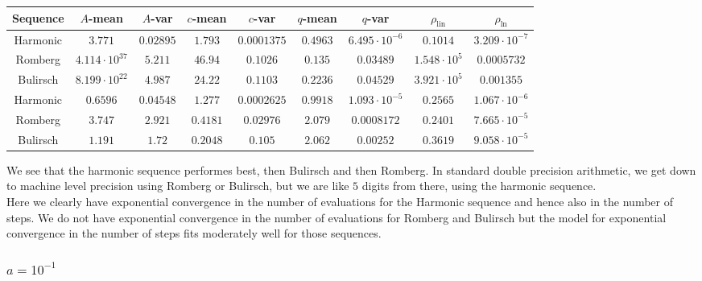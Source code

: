 \begin{table}[H]
    \centering
        \small
        \begin{tabular}{c||c|c|c|c|c|c|c|c}
Sequence & \(A\)-mean & \(A\)-var & \(c\)-mean & \(c\)-var & \(q\)-mean & \(q\)-var & \(\rho_{\operatorname{lin}}\) & \(\rho_{\ln}\)\\\hline
\rowcolor{green}
Harmonic & \(3.771\) & \(0.02895\) & \(1.793\) & \(0.0001375\) & \(0.4963\) & \(6.495\cdot 10^{-6}\) & \(0.1014\) & \(3.209\cdot 10^{-7}\) \\
\rowcolor{yellow}
Romberg & \(4.114\cdot 10^{37}\) & \(5.211\) & \(46.94\) & \(0.1026\) & \(0.135\) & \(0.03489\) & \(1.548\cdot 10^5\) & \(0.0005732\) \\
\rowcolor{yellow}
Bulirsch & \(8.199\cdot 10^{22}\) & \(4.987\) & \(24.22\) & \(0.1103\) & \(0.2236\) & \(0.04529\) & \(3.921\cdot 10^5\) & \(0.001355\) \\
\rowcolor{green}
Harmonic & \(0.6596\) & \(0.04548\) & \(1.277\) & \(0.0002625\) & \(0.9918\) & \(1.093\cdot 10^{-5}\) & \(0.2565\) & \(1.067\cdot 10^{-6}\) \\
\rowcolor{red}
Romberg & \(3.747\) & \(2.921\) & \(0.4181\) & \(0.02976\) & \(2.079\) & \(0.0008172\) & \(0.2401\) & \(7.665\cdot 10^{-5}\) \\
\rowcolor{red}
Bulirsch & \(1.191\) & \(1.72\) & \(0.2048\) & \(0.105\) & \(2.062\) & \(0.00252\) & \(0.3619\) & \(9.058\cdot 10^{-5}\) \\
    \end{tabular}
    \label{tab:my_label}
\end{table}

We see that the harmonic sequence performes best, then Bulirsch and then Romberg. In standard double precision arithmetic, we get down to machine level precision using Romberg or Bulirsch, but we are like \(5\) digits from there, using the harmonic sequence.\\

Here we clearly have exponential convergence in the number of evaluations for the Harmonic sequence and hence also in the number of steps. We do not have exponential convergence in the number of evaluations for Romberg and Bulirsch but the model for exponential convergence in the number of steps fits moderately well for those sequences. 

\subsubsection{\(a = 10^{-1}\)}

